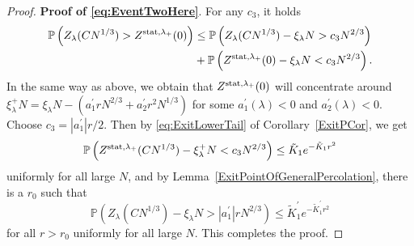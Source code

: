 \documentclass[12pt,a4paper]{article}
\numberwithin{equation}{section}
\newcommand{\Pb}{\mathbb{P}}
\begin{document}
\begin{proof}
\textbf{Proof of \eqref{eq:EventTwoHere}}. For any $c_3$, it holds
\begin{align}\label{eq:Dividingprobability2}
\Pb \left(Z_\lambda(CN^{1/3})> Z^{{\rm stat},\lambda_+}(0)\right) &\leq \Pb\left(Z_\lambda(CN^{1/3})-\xi_\lambda N>c_3N^{2/3}\right)\nonumber\\&+ \Pb\left(Z^{{\rm stat},\lambda_+}(0)-\xi_\lambda N<c_3N^{2/3}\right).
\end{align}
In the same way as above, we obtain that $Z^{{\rm stat},\lambda_{+}}(0)$ will concentrate around $\xi^{+}_{\lambda}N=\xi_{\lambda}N-(a^{\prime}_1 r N^{2/3}+a^{\prime}_2 r^2 N^{1/3})$ for some $a_1^\prime(\lambda)<0$ and $a_2^\prime(\lambda)<0$. Choose $c_3=|a^{\prime}_1|r/2$. Then by \eqref{eq:ExitLowerTail} of Corollary~\ref{ExitPCor}, we get
\begin{equation}
\Pb\left(Z^{{\rm stat},\lambda_+}(CN^{1/3})- \xi^{+}_{\lambda}N <c_3 N^{2/3}\right)\leq \tilde{K}_1e^{-\tilde{K}_1 r^2}
\end{equation}
uniformly for all large $N$, and by Lemma~\ref{ExitPointOfGeneralPercolation}, there is a $r_0$ such that
\begin{equation}
\Pb\left(Z_{\lambda}(CN^{1/3})-\xi_{\lambda} N>|a^{\prime}_1|r N^{2/3}\right)\leq \tilde{K}^{\prime}_1 e^{-\tilde{K}^{\prime}_1 r^2}
\end{equation}
for all $r>r_0$ uniformly for all large $N$. This completes the proof.
\end{proof}
\end{document}
